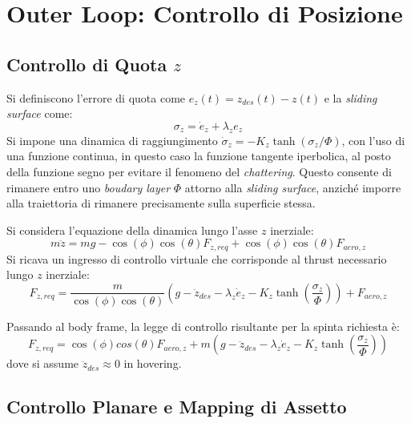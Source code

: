 \section{Outer Loop: Controllo di Posizione}

\subsection{Controllo di Quota \texorpdfstring{$z$}{z}}

Si definiscono l'errore di quota come $e_z(t) = z_{des}(t) - z(t)$ e la \textit{sliding surface} come:
\begin{equation}
    \sigma_z = \dot{e}_z + \lambda_z e_z
\end{equation}
Si impone una dinamica di raggiungimento $\dot{\sigma}_z = -K_z \tanh \left(\sigma_z / \Phi \right)$, con l'uso di una funzione continua, in questo caso la funzione tangente iperbolica, 
al posto della funzione segno per evitare il fenomeno del \textit{chattering}. Questo consente di rimanere entro uno \textit{boudary layer} $\Phi$ attorno alla \textit{sliding surface}, anziché imporre
alla traiettoria di rimanere precisamente sulla superficie stessa.

Si considera l'equazione della dinamica lungo l'asse $z$ inerziale:
\begin{equation}
    m\ddot{z} = mg - \cos(\phi)\cos(\theta) F_{z,req} + \cos(\phi)\cos(\theta) F_{aero,z}
\end{equation}
Si ricava un ingresso di controllo virtuale che corrisponde al thrust necessario lungo $z$ inerziale:
\begin{equation}
    F_{z,req} = \frac{m}{\cos(\phi) \cos(\theta)} \left(g - \ddot{z}_{des} - \lambda_z \dot{e}_z - K_z \tanh\left(\frac{\sigma_z}{\Phi}\right) \right) + F_{aero,z}
\end{equation}

Passando al body frame, la legge di controllo risultante per la spinta richiesta è:
\begin{equation}
    F_{z,req} = \cos(\phi)cos(\theta) F_{aero,z} + m \left(g - \ddot{z}_{des} - \lambda_z \dot{e}_z - K_z \tanh\left(\frac{\sigma_z}{\Phi}\right) \right)
\end{equation}
dove si assume $\ddot{z}_{des} \approx 0$ in hovering.

\clearpage

\subsection{Controllo Planare e Mapping di Assetto}

